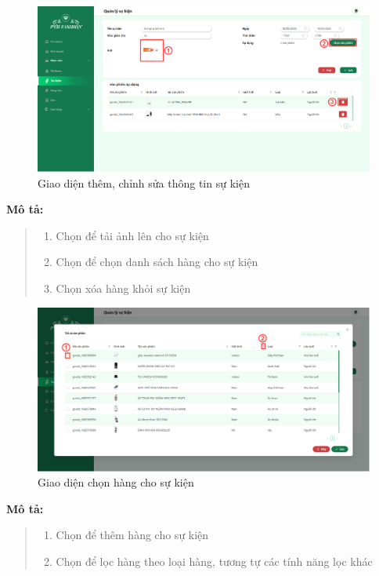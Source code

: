 \begin{figure}[!htp]
    \centering
    \includegraphics[width=12cm]{img/UI/admin_implement/eventEdit.png}
    \newline
    \caption{Giao diện thêm, chỉnh sửa thông tin sự kiện}
\end{figure}
\textbf{Mô tả:}
\begin{quote}
    \begin{enumerate}
        \item Chọn để tải ảnh lên cho sự kiện
        \item Chọn để chọn danh sách hàng cho sự kiện
        \item Chọn xóa hàng khỏi sự kiện
    \end{enumerate}
\end{quote}


\begin{figure}[!htp]
    \centering
    \includegraphics[width=12cm]{img/UI/admin_implement/eventAllGoods.png}
    \newline
    \caption{Giao diện chọn hàng cho sự kiện}
\end{figure}
\textbf{Mô tả:}
\begin{quote}
    \begin{enumerate}
        \item Chọn để thêm hàng cho sự kiện
        \item Chọn để lọc hàng theo loại hàng, tương tự các tính năng lọc khác
    \end{enumerate}
\end{quote}

